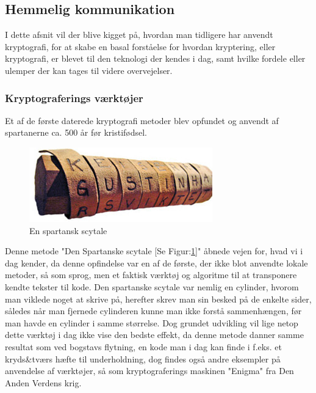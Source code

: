 \subsection{Hemmelig kommunikation}
I dette afsnit vil der blive kigget på, hvordan man tidligere har anvendt kryptografi, for at skabe en basal forståelse for hvordan kryptering, eller kryptografi, er blevet til den teknologi der kendes i dag, samt hvilke fordele eller ulemper der kan tages til videre overvejelser.
\subsubsection{Kryptograferings værktøjer}
Et af de første daterede kryptografi metoder blev opfundet og anvendt af spartanerne ca. 500 år før kristifødsel. \\
\begin{figure}[H]
    \centering
    \includegraphics[scale=1.0]{Projectdoc/Problemanalyse/Illustrationer/scytale.jpg}
    \caption{En spartansk scytale}
    \label{fig:scytale}
\end{figure}
\noindent
Denne metode "Den Spartanske scytale [Se Figur:\ref{fig:scytale}]" åbnede vejen for, hvad vi i dag kender, da denne opfindelse var en af de første, der ikke blot anvendte lokale metoder, så som sprog, men et faktisk værktøj og algoritme til at transponere kendte tekster til kode. Den spartanske scytale var nemlig en cylinder, hvorom man viklede noget at skrive på, herefter skrev man sin besked på de enkelte sider, således når man fjernede cylinderen kunne man ikke forstå sammenhængen, før man havde en cylinder i samme størrelse.\cite{PastCryptography} Dog grundet udvikling vil lige netop dette værktøj i dag ikke vise den bedste effekt, da denne metode danner samme resultat som ved bogstavs flytning, en kode man i dag kan finde i f.eks. et kryds\&tværs hæfte til underholdning, dog findes også andre eksempler på anvendelse af værktøjer, så som kryptograferings maskinen "Enigma" fra Den Anden Verdens krig.

